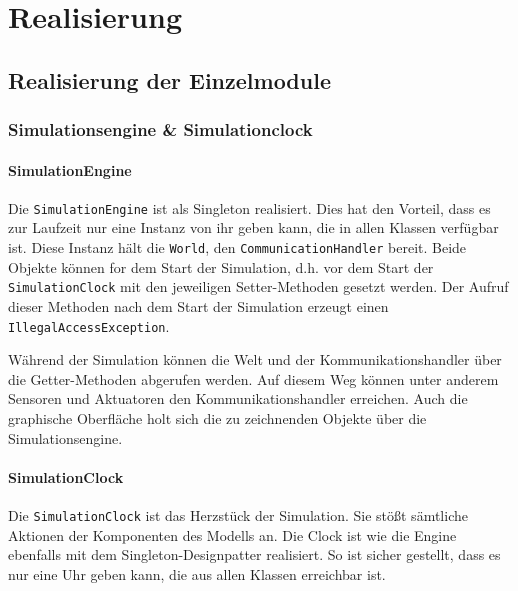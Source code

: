 \chapter{Realisierung}\label{chapter:realization}



\section{Realisierung der Einzelmodule}

\subsection{Simulationsengine \& Simulationclock}\label{subsec:real_engine}
\subsubsection{SimulationEngine}
Die \texttt{SimulationEngine} ist als Singleton realisiert. Dies hat den Vorteil, dass es zur Laufzeit nur eine Instanz von ihr geben kann, die in allen Klassen verfügbar ist. Diese Instanz hält die \texttt{World}, den \texttt{CommunicationHandler} bereit. Beide Objekte können for dem Start der Simulation, d.h. vor dem Start der \texttt{SimulationClock} mit den jeweiligen Setter-Methoden gesetzt werden. Der Aufruf dieser Methoden nach dem Start der Simulation erzeugt einen \texttt{IllegalAccessException}.

Während der Simulation können die Welt und der Kommunikationshandler über die Getter-Methoden abgerufen werden. Auf diesem Weg können unter anderem Sensoren und Aktuatoren den Kommunikationshandler erreichen. Auch die graphische Oberfläche holt sich die zu zeichnenden Objekte über die Simulationsengine.

\subsubsection{SimulationClock}
Die \texttt{SimulationClock} ist das Herzstück der Simulation. Sie stößt sämtliche Aktionen der Komponenten des Modells an. Die Clock ist wie die Engine ebenfalls mit dem Singleton-Designpatter realisiert. So ist sicher gestellt, dass es nur eine Uhr geben kann, die aus allen Klassen erreichbar ist.

